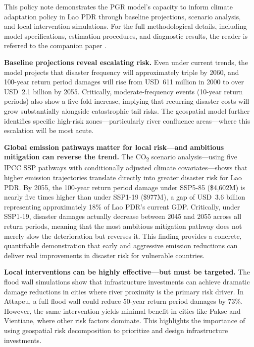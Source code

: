 \documentclass[11pt,a4paper]{article}
\begin{document}
This policy note demonstrates the PGR model's capacity to inform climate adaptation policy in Lao PDR through baseline projections, scenario analysis, and local intervention simulations. For the full methodological details, including model specifications, estimation procedures, and diagnostic results, the reader is referred to the companion paper \cite{saldarriaga2026}.

\textbf{Baseline projections reveal escalating risk.} Even under current trends, the model projects that disaster frequency will approximately triple by 2060, and 100-year return period damages will rise from USD~611 million in 2000 to over USD~2.1 billion by 2055. Critically, moderate-frequency events (10-year return periods) also show a five-fold increase, implying that recurring disaster costs will grow substantially alongside catastrophic tail risks. The geospatial model further identifies specific high-risk zones---particularly river confluence areas---where this escalation will be most acute.

\textbf{Global emission pathways matter for local risk---and ambitious mitigation can reverse the trend.} The CO\textsubscript{2} scenario analysis---using five IPCC SSP pathways with conditionally adjusted climate covariates---shows that higher emission trajectories translate directly into greater disaster risk for Lao PDR. By 2055, the 100-year return period damage under SSP5-85 (\$4,602M) is nearly five times higher than under SSP1-19 (\$977M), a gap of USD~3.6 billion representing approximately 18\% of Lao PDR's current GDP. Critically, under SSP1-19, disaster damages actually decrease between 2045 and 2055 across all return periods, meaning that the most ambitious mitigation pathway does not merely slow the deterioration but reverses it. This finding provides a concrete, quantifiable demonstration that early and aggressive emission reductions can deliver real improvements in disaster risk for vulnerable countries.

\textbf{Local interventions can be highly effective---but must be targeted.} The flood wall simulations show that infrastructure investments can achieve dramatic damage reductions in cities where river proximity is the primary risk driver. In Attapeu, a full flood wall could reduce 50-year return period damages by 73\%. However, the same intervention yields minimal benefit in cities like Pakse and Vientiane, where other risk factors dominate. This highlights the importance of using geospatial risk decomposition to prioritize and design infrastructure investments.
\end{document}
